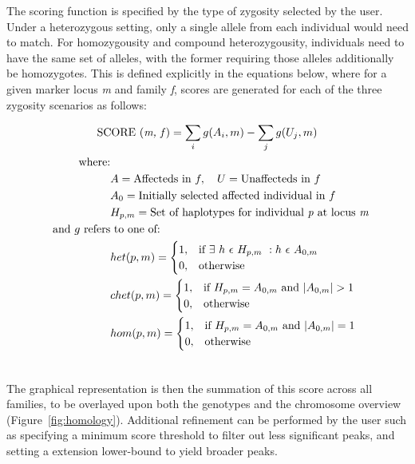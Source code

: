 \documentclass{assets/biotemplate/bioinfo}
\numberwithin{equation}{section}
\begin{document}
\begin{methods}
The scoring function is specified by the type of zygosity selected by the user. Under a heterozygous setting, only a single allele from each individual would need to match. For homozygousity and compound heterozygousity, individuals need to have the same set of alleles, with the former requiring those alleles additionally be homozygotes.
This is defined explicitly in the equations below, where for a given marker locus \textit{m} and family \textit{f}, scores are generated for each of the three zygosity scenarios as follows:

\begin{gather}
\text{SCORE (\textit{m, f})} = \sum_{i}{g(A_i,m)} - \sum_{j}{g(U_j,m)}\\
\
\begin{flalign}
\nonumber\
\text{where:}&\\
\nonumber\
& A = \text{Affecteds in }f,\ \ \ U = \text{Unaffecteds in }f\\
\nonumber\
& A_0 = \text{Initially selected affected individual in }f\\
\nonumber\
& H_{p,m} = \text{Set of haplotypes for individual \textit{p} at locus \textit{m}}\\
\nonumber\
\text{and }g \text{ refers} & \text{ to one of:}\\
\nonumber
& het(p,m) = \begin{cases}
	1 ,& \text{if } \exists\ h\ \epsilon\ H_{p,m}\ : h\ \epsilon\  A_{0,m}\\
	0 ,& \text{otherwise}
		\end{cases}\\
\nonumber\
& chet(p,m) = \begin{cases}
	1 ,& \text{if } H_{p,m} = A_{0,m} \text{ and } |A_{0,m}| > 1\\
	0 ,& \text{otherwise}
		\end{cases}\\
\nonumber
& hom(p,m) = \begin{cases}
	1 ,& \text{if } H_{p,m} = A_{0,m}  \text{ and } |A_{0,m}| = 1\\
	0 ,& \text{otherwise}
		\end{cases}\\
\nonumber
\end{flalign}
\end{gather}

The graphical representation is then the summation of this score across all families, to be overlayed upon both the genotypes and the chromosome overview (Figure~\ref{fig:homology}). Additional refinement can be performed by the user such as specifying a minimum score threshold to filter out less significant peaks, and setting a extension lower-bound to yield broader peaks.

\end{methods}
\end{document}
